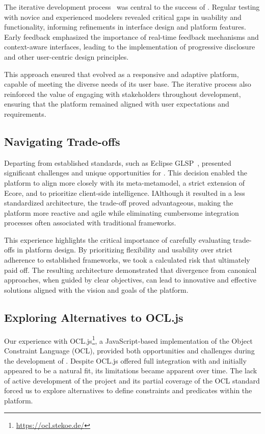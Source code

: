 The iterative development process~\cite{4668134} was central to the success of \jjodel{}. Regular testing with novice and experienced modelers revealed critical gaps in usability and functionality, informing refinements in interface design and platform features. Early feedback emphasized the importance of real-time feedback mechanisms and context-aware interfaces, leading to the implementation of progressive disclosure and other user-centric design principles.

This approach ensured that \jjodel{} evolved as a responsive and adaptive platform, capable of meeting the diverse needs of its user base. The iterative process also reinforced the value of engaging with stakeholders throughout development, ensuring that the platform remained aligned with user expectations and requirements.

\subsection{Navigating Trade-offs}

Departing from established standards, such as Eclipse GLSP~\cite{bork2023vision}, presented significant challenges and unique opportunities for \jjodel{}. This decision enabled the platform to align more closely with its meta-metamodel, a strict extension of Ecore, and to prioritize client-side intelligence. IAlthough it resulted in a less standardized architecture, the trade-off proved advantageous, making the platform more reactive and agile while eliminating cumbersome integration processes often associated with traditional frameworks.

This experience highlights the critical importance of carefully evaluating trade-offs in platform design. By prioritizing flexibility and usability over strict adherence to established frameworks, we took a calculated risk that ultimately paid off. The resulting architecture demonstrated that divergence from canonical approaches, when guided by clear objectives, can lead to innovative and effective solutions aligned with the vision and goals of the platform.

\subsection{Exploring Alternatives to OCL.js}
Our experience with OCL.js\footnote{\url{https://ocl.stekoe.de/}}, a JavaScript-based implementation of the Object Constraint Language (OCL), provided both opportunities and challenges during the development of \jjodel{}. Despite OCL.js offered full integration with \jjodel{} and initially appeared to be a natural fit, its limitations became apparent over time. The lack of active development of the project and its partial coverage of the OCL standard forced us to explore alternatives to define constraints and predicates within the platform.

